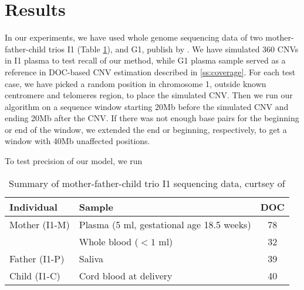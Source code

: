 \section{Results}
In our experiments, we have used whole genome sequencing data of two mother-father-child trios I1 (Table \ref{tab:I1}), and G1, publish by \cite{kitzman2012}. We have simulated 360 CNVs in I1 plasma to test recall of our method, while G1 plasma sample served as a reference in DOC-based CNV estimation described in \ref{ss:coverage}. For each test case, we have picked a random position in chromosome 1, outside known centromere and telomeres region, to place the simulated CNV. Then we run our algorithm on a sequence window starting 20Mb before the simulated CNV and ending 20Mb after the CNV. If there was not enough base pairs for the beginning or end of the window, we extended the end or beginning, respectively, to get a window with 40Mb unaffected positions.

To test precision of our model, we run 

\begin{table}[t]
\centering
\begin{tabular}{l|l|c}
Individual & Sample & DOC \\ \hline
Mother (I1-M) & Plasma (5 ml, gestational age 18.5 weeks) & 78 \\
	& Whole blood ($<1$ ml) & 32 \\
Father (I1-P) & Saliva & 39 \\
Child (I1-C) & Cord blood at delivery & 40
\end{tabular}
\vspace{3pt}
\caption{Summary of mother-father-child trio I1 sequencing data, curtsey of \cite{kitzman2012}  }
\label{tab:I1} 
\end{table}



\cite{abyzov2011cnvnator}
